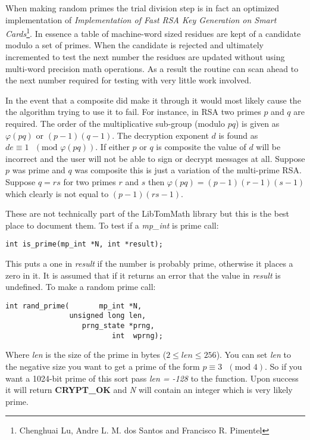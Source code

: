 \documentclass[synpaper]{book}
\def\phi{\varphi}
\begin{document}
When making random primes the trial division step is in fact an optimized implementation of \textit{Implementation of Fast RSA Key Generation on Smart Cards}\footnote{Chenghuai Lu, Andre L. M. dos Santos and Francisco R. Pimentel}.
In essence a table of machine-word sized residues are kept of a candidate modulo a set of primes.  When the candidate
is rejected and ultimately incremented to test the next number the residues are updated without using multi-word precision
math operations.  As a result the routine can scan ahead to the next number required for testing with very little work
involved.

In the event that a composite did make it through it would most likely cause the the algorithm trying to use it to fail.  For
instance, in RSA two primes $p$ and $q$ are required.  The order of the multiplicative sub-group (modulo $pq$) is given
as $\phi(pq)$ or $(p - 1)(q - 1)$.  The decryption exponent $d$ is found as $de \equiv 1\mbox{ }(\mbox{mod } \phi(pq))$.  If either $p$ or $q$ is composite the value of $d$ will be incorrect and the user
will not be able to sign or decrypt messages at all.  Suppose $p$ was prime and $q$ was composite this is just a variation of
the multi-prime RSA.  Suppose $q = rs$ for two primes $r$ and $s$ then $\phi(pq) = (p - 1)(r - 1)(s - 1)$ which clearly is
not equal to $(p - 1)(rs - 1)$.

These are not technically part of the LibTomMath library but this is the best place to document them.
To test if a \textit{mp\_int} is prime call:
\begin{verbatim}
int is_prime(mp_int *N, int *result);
\end{verbatim}
This puts a one in \textit{result} if the number is probably prime, otherwise it places a zero in it.  It is assumed that if
it returns an error that the value in \textit{result} is undefined.  To make
a random prime call:
\begin{verbatim}
int rand_prime(       mp_int *N,
               unsigned long len,
                  prng_state *prng,
                         int  wprng);
\end{verbatim}
Where \textit{len} is the size of the prime in bytes ($2 \le len \le 256$).  You can set \textit{len} to the negative size you want
to get a prime of the form $p \equiv 3\mbox{ }(\mbox{mod } 4)$.  So if you want a 1024-bit prime of this sort pass
\textit{len = -128} to the function.  Upon success it will return {\bf CRYPT\_OK} and \textit{N} will contain an integer which
is very likely prime.
\end{document}
